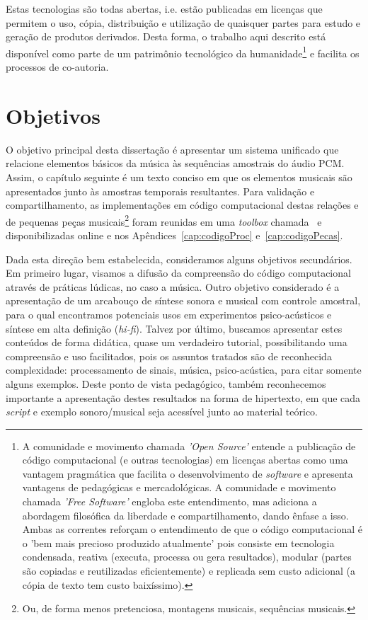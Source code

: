 Estas tecnologias são todas abertas, i.e. estão publicadas em licenças que permitem o uso, cópia, distribuição e utilização de quaisquer partes para estudo e geração de produtos derivados. Desta forma, o trabalho aqui descrito está disponível como parte de um patrimônio tecnológico da humanidade\footnote{A comunidade e movimento chamada \emph{'Open Source'} entende a publicação de código computacional (e outras tecnologias) em licenças abertas como uma vantagem pragmática que facilita o desenvolvimento de \emph{software} e apresenta vantagens de pedagógicas e mercadológicas. A comunidade e movimento chamada \emph{'Free Software'} engloba este entendimento, mas adiciona a abordagem filosófica da liberdade e compartilhamento, dando ênfase a isso. Ambas as correntes reforçam o entendimento de que o código computacional é o 'bem mais precioso produzido atualmente' pois consiste em tecnologia condensada, reativa (executa, processa ou gera resultados), modular (partes são copiadas e reutilizadas eficientemente) e replicada sem custo adicional (a cópia de texto tem custo baixíssimo).\cite{Raymond,Lessig}} e facilita os processos de co-autoria.

    \section{Objetivos}
   \label{sec:objetivos}
O objetivo principal desta dissertação é apresentar um sistema unificado que relacione elementos básicos da música às sequências amostrais do áudio PCM. Assim, o capítulo seguinte é um texto conciso em que os elementos musicais são apresentados junto às amostras temporais resultantes. Para validação e compartilhamento, as implementações em código computacional destas relações e de pequenas peças musicais\footnote{Ou, de forma menos pretenciosa, montagens musicais, sequências musicais.} foram reunidas em uma \emph{toolbox} chamada \massa\ e disponibilizadas online e nos Apêndices~\ref{cap:codigoProc} e~\ref{cap:codigoPecas}. 

Dada esta direção bem estabelecida, consideramos alguns objetivos secundários. Em primeiro lugar, visamos a difusão da compreensão do código computacional através de práticas lúdicas, no caso a música. Outro objetivo considerado é a apresentação de um arcabouço de síntese sonora e musical com controle amostral, para o qual encontramos potenciais usos em experimentos psico-acústicos e síntese em alta definição (\emph{hi-fi}). Talvez por último, buscamos apresentar estes conteúdos de forma didática, quase um verdadeiro tutorial, possibilitando uma compreensão e uso facilitados, pois os assuntos tratados são de reconhecida complexidade: processamento de sinais, música, psico-acústica, para citar somente alguns exemplos. Deste ponto de vista pedagógico, também reconhecemos importante a apresentação destes resultados na forma de hipertexto, em que cada \emph{script} e exemplo sonoro/musical seja acessível junto ao material teórico.
  
